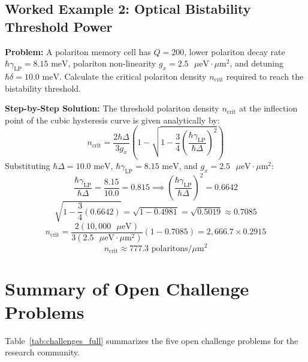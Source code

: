 \documentclass[11pt,a4paper]{article}
\begin{document}
\subsection{Worked Example 2: Optical Bistability Threshold Power}
\textbf{Problem:} A polariton memory cell has $Q = 200$, lower polariton decay rate $\hbar\gamma_{\text{LP}} = 8.15\text{ meV}$, polariton non-linearity $g_x = 2.5\text{ }\mu\text{eV}\cdot\mu\text{m}^2$, and detuning $\hbar\delta = 10.0\text{ meV}$. Calculate the critical polariton density $n_{\text{crit}}$ required to reach the bistability threshold.

\textbf{Step-by-Step Solution:}
The threshold polariton density $n_{\text{crit}}$ at the inflection point of the cubic hysteresis curve is given analytically by:
\begin{equation}
n_{\text{crit}} = \frac{2 \hbar\Delta}{3 g_x} \left( 1 - \sqrt{1 - \frac{3}{4}\left(\frac{\hbar\gamma_{\text{LP}}}{\hbar\Delta}\right)^2} \right)
\end{equation}
Substituting $\hbar\Delta = 10.0\text{ meV}$, $\hbar\gamma_{\text{LP}} = 8.15\text{ meV}$, and $g_x = 2.5\text{ }\mu\text{eV}\cdot\mu\text{m}^2$:
\begin{equation}
\frac{\hbar\gamma_{\text{LP}}}{\hbar\Delta} = \frac{8.15}{10.0} = 0.815 \implies \left(\frac{\hbar\gamma_{\text{LP}}}{\hbar\Delta}\right)^2 = 0.6642
\end{equation}
\begin{equation}
\sqrt{1 - \frac{3}{4}(0.6642)} = \sqrt{1 - 0.4981} = \sqrt{0.5019} \approx 0.7085
\end{equation}
\begin{equation}
n_{\text{crit}} = \frac{2 (10,000\text{ }\mu\text{eV})}{3 (2.5\text{ }\mu\text{eV}\cdot\mu\text{m}^2)} (1 - 0.7085) = 2,666.7 \times 0.2915
\end{equation}
$$n_{\text{crit}} \approx 777.3\text{ polaritons/}\mu\text{m}^2$$

\section{Summary of Open Challenge Problems}

Table~\ref{tab:challenges_full} summarizes the five open challenge problems for the research community.
\end{document}
